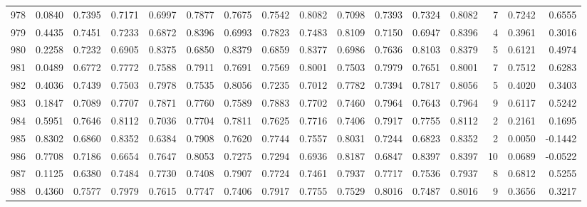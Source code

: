 \begin{tabular}{lrrrrrrrrrrrrrrr}
978 &      0.0840 &  0.7395 &  0.7171 &  0.6997 &  0.7877 &  0.7675 &  0.7542 &  0.8082 &  0.7098 &  0.7393 &   0.7324 &     0.8082 &      7 &                    0.7242 &                     0.6555 \\
979 &      0.4435 &  0.7451 &  0.7233 &  0.6872 &  0.8396 &  0.6993 &  0.7823 &  0.7483 &  0.8109 &  0.7150 &   0.6947 &     0.8396 &      4 &                    0.3961 &                     0.3016 \\
980 &      0.2258 &  0.7232 &  0.6905 &  0.8375 &  0.6850 &  0.8379 &  0.6859 &  0.8377 &  0.6986 &  0.7636 &   0.8103 &     0.8379 &      5 &                    0.6121 &                     0.4974 \\
981 &      0.0489 &  0.6772 &  0.7772 &  0.7588 &  0.7911 &  0.7691 &  0.7569 &  0.8001 &  0.7503 &  0.7979 &   0.7651 &     0.8001 &      7 &                    0.7512 &                     0.6283 \\
982 &      0.4036 &  0.7439 &  0.7503 &  0.7978 &  0.7535 &  0.8056 &  0.7235 &  0.7012 &  0.7782 &  0.7394 &   0.7817 &     0.8056 &      5 &                    0.4020 &                     0.3403 \\
983 &      0.1847 &  0.7089 &  0.7707 &  0.7871 &  0.7760 &  0.7589 &  0.7883 &  0.7702 &  0.7460 &  0.7964 &   0.7643 &     0.7964 &      9 &                    0.6117 &                     0.5242 \\
984 &      0.5951 &  0.7646 &  0.8112 &  0.7036 &  0.7704 &  0.7811 &  0.7625 &  0.7716 &  0.7406 &  0.7917 &   0.7755 &     0.8112 &      2 &                    0.2161 &                     0.1695 \\
985 &      0.8302 &  0.6860 &  0.8352 &  0.6384 &  0.7908 &  0.7620 &  0.7744 &  0.7557 &  0.8031 &  0.7244 &   0.6823 &     0.8352 &      2 &                    0.0050 &                    -0.1442 \\
986 &      0.7708 &  0.7186 &  0.6654 &  0.7647 &  0.8053 &  0.7275 &  0.7294 &  0.6936 &  0.8187 &  0.6847 &   0.8397 &     0.8397 &     10 &                    0.0689 &                    -0.0522 \\
987 &      0.1125 &  0.6380 &  0.7484 &  0.7730 &  0.7408 &  0.7907 &  0.7724 &  0.7461 &  0.7937 &  0.7717 &   0.7536 &     0.7937 &      8 &                    0.6812 &                     0.5255 \\
988 &      0.4360 &  0.7577 &  0.7979 &  0.7615 &  0.7747 &  0.7406 &  0.7917 &  0.7755 &  0.7529 &  0.8016 &   0.7487 &     0.8016 &      9 &                    0.3656 &                     0.3217 \\

\end{tabular}
